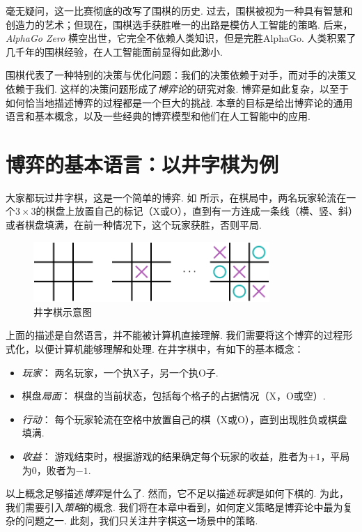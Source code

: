 毫无疑问，这一比赛彻底的改写了围棋的历史. 过去，围棋被视为一种具有智慧和创造力的艺术；但现在，围棋选手获胜唯一的出路是模仿人工智能的策略. 后来，\textit{AlphaGo Zero} 横空出世，它完全不依赖人类知识，但是完胜AlphaGo. 人类积累了几千年的围棋经验，在人工智能面前显得如此渺小. 

围棋代表了一种特别的决策与优化问题：我们的决策依赖于对手，而对手的决策又依赖于我们. 这样的决策问题形成了\textit{博弈论}的研究对象. 博弈是如此复杂，以至于如何恰当地描述博弈的过程都是一个巨大的挑战. 本章的目标是给出博弈论的通用语言和基本概念，以及一些经典的博弈模型和他们在人工智能中的应用.

\section{博弈的基本语言：以井字棋为例}\label{sec:game-basic}

大家都玩过井字棋，这是一个简单的博弈. 如 所示，在棋局中，两名玩家轮流在一个$3\times 3$的棋盘上放置自己的标记（X或O），直到有一方连成一条线（横、竖、斜）或者棋盘填满，在前一种情况下，这个玩家获胜，否则平局. 

\begin{figure}[ht]
    \centering
    \includegraphics[width=0.8\textwidth]{figures/game/tic-tac-toe-game.pdf}
    \caption{井字棋示意图}
    \label{fig:tic-tac-toe-game}
\end{figure}

上面的描述是自然语言，并不能被计算机直接理解. 我们需要将这个博弈的过程形式化，以便计算机能够理解和处理. 在井字棋中，有如下的基本概念：
\begin{itemize}
    \item \textit{玩家}： 两名玩家，一个执X子，另一个执O子.
    \item 棋盘\textit{局面}： 棋盘的当前状态，包括每个格子的占据情况（X，O或空）.
    \item \textit{行动}： 每个玩家轮流在空格中放置自己的棋（X或O），直到出现胜负或棋盘填满.
    \item \textit{收益}： 游戏结束时，根据游戏的结果确定每个玩家的收益，胜者为$+1$，平局为$0$，败者为$-1$.
\end{itemize}

以上概念足够描述\textit{博弈}是什么了. 然而，它不足以描述\textit{玩家}是如何下棋的. 为此，我们需要引入\textit{策略}的概念. 我们将在本章中看到，如何定义策略是博弈论中最为复杂的问题之一. 此刻，我们只关注井字棋这一场景中的策略.

